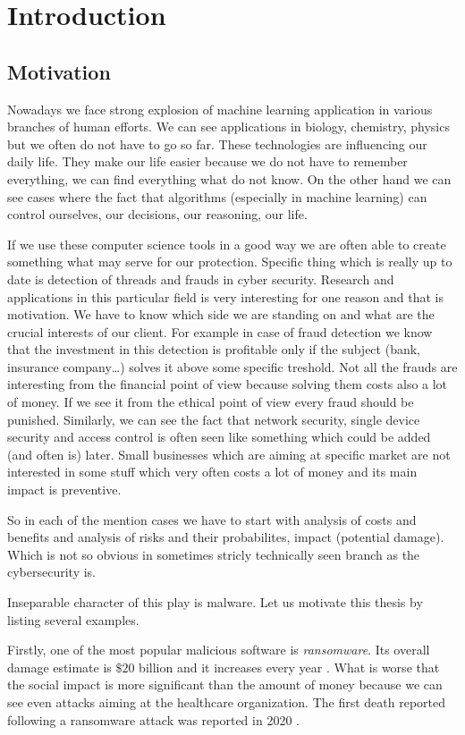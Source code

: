 \chapter{Introduction} \label{chap:intro}
\section{Motivation}
Nowadays we face strong explosion of machine learning application in various branches of human efforts. We can see applications in biology, chemistry, physics but we often do not have to go so far. These technologies are influencing our daily life. They make our life easier because we do not have to remember everything, we can find everything what do not know. On the other hand we can see cases where the fact that algorithms (especially in machine learning) can control ourselves, our decisions, our reasoning, our life.

If we use these computer science tools in a good way we are often able to create something what may serve for our protection. Specific thing which is really up to date is detection of threads and frauds in cyber security. Research and applications in this particular field is very interesting for one reason and that is motivation. We have to know which side we are standing on and what are the crucial interests of our client. For example in case of fraud detection we know that the investment in this detection is profitable only if the subject (bank, insurance company\dots) solves it above some specific treshold. Not all the frauds are interesting from the financial point of view because solving them costs also a lot of money. If we see it from the ethical point of view every fraud should be punished. Similarly, we can see the fact that network security, single device security and access control is often seen like something which could be added (and often is) later. Small businesses which are aiming at specific market are not interested in some stuff which very often costs a lot of money and its main impact is preventive. 

So in each of the mention cases we have to start with analysis of costs and benefits and analysis of risks and their probabilites, impact (potential damage). Which is not so obvious in sometimes stricly technically seen branch as the cybersecurity is.

Inseparable character of this play is malware. Let us motivate this thesis by listing several examples.

Firstly, one of the most popular malicious software is \emph{ransomware}. Its overall damage estimate is $\$20$ billion and it increases every year \cite{purplesec2021}. What is worse that the social impact is more significant than the amount of money because we can see even attacks aiming at the healthcare organization. The first death reported following a ransomware attack was reported in 2020 \cite{Cimpanu2020}.

